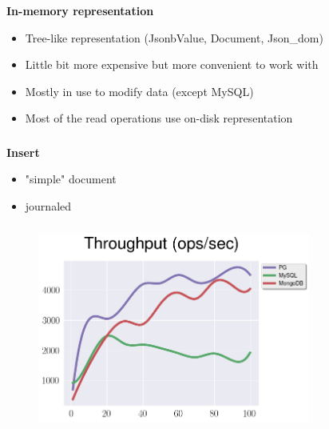 \documentclass[usenames,dvipsnames, 18pt, compress, aspectratio=169]{beamer}
\begin{document}
\begin{frame}
    \frametitle{}
    \textbf{In-memory representation}
    \begin{center}
        \begin{itemize}[label={\MVRightarrow}]
            \item Tree-like representation (JsonbValue, Document, Json\_dom)
            \item Little bit more expensive but more convenient to work with
            \item Mostly in use to modify data (except MySQL)
            \item Most of the read operations use on-disk representation
        \end{itemize}
    \end{center}
\end{frame}

\begin{frame}
    \frametitle{}
    \begin{center}
        \textbf{Insert}
        \begin{itemize}[label={}]
            \item "simple" document
            \item journaled
        \end{itemize}
    \end{center}
\end{frame}

\begin{frame}
    \frametitle{}
    \begin{center}
    \vspace{10pt}
    \begin{figure}
        \includegraphics[width=0.8\textwidth,center]{benchmarks/insert_throughput_journaled2.png}
    \end{figure}
    \end{center}
\end{frame}
\end{document}
